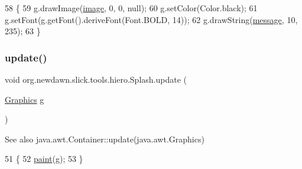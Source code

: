 \begin{DoxyCode}
58                                   \{
59         g.drawImage(\mbox{\hyperlink{classorg_1_1newdawn_1_1slick_1_1tools_1_1hiero_1_1_splash_aa7f9bf57a1205b3ed105ae9392f17cff}{image}}, 0, 0, null);
60         g.setColor(Color.black);
61         g.setFont(g.getFont().deriveFont(Font.BOLD, 14));
62         g.drawString(\mbox{\hyperlink{classorg_1_1newdawn_1_1slick_1_1tools_1_1hiero_1_1_splash_a9e7ce871c3624f5153d712d0e38e9312}{message}}, 10, 235);
63     \}
\end{DoxyCode}
\mbox{\label{classorg_1_1newdawn_1_1slick_1_1tools_1_1hiero_1_1_splash_a69636eb36c7d982dd24bac9e3f30893e}} 
\subsubsection{\texorpdfstring{update()}{update()}}
{\footnotesize\ttfamily void org.\+newdawn.\+slick.\+tools.\+hiero.\+Splash.\+update (\begin{DoxyParamCaption}\item[{\mbox{\hyperlink{classorg_1_1newdawn_1_1slick_1_1_graphics}{Graphics}}}]{g }\end{DoxyParamCaption})\hspace{0.3cm}{\ttfamily [inline]}}

\begin{DoxySeeAlso}{See also}
java.\+awt.\+Container\+::update(java.\+awt.\+Graphics) 
\end{DoxySeeAlso}

\begin{DoxyCode}
51                                    \{
52         \mbox{\hyperlink{classorg_1_1newdawn_1_1slick_1_1tools_1_1hiero_1_1_splash_accda1ecae214ca97c121caf5de258c0d}{paint}}(g);
53     \}
\end{DoxyCode}
\mbox{\label{classorg_1_1newdawn_1_1slick_1_1tools_1_1hiero_1_1_splash_a467907efe0d4c6dabd2b1f60ecefd660}} 
